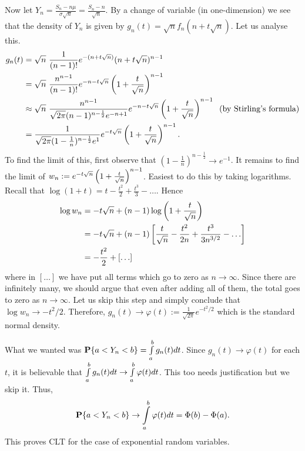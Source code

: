\documentclass[preprint,  11pt]{amsart}
\def\sig{{\sigma}}
\renewcommand\phi{{\varphi}}
\begin{document}
Now let $Y_{n}=\frac{S_{n}-n\mu}{\sig\sqrt{n}}=\frac{S_{n}-n}{\sqrt{n}}$. By a change of variable (in one-dimension) we see that the density of $Y_{n}$ is given by $g_{n}(t)=\sqrt{n}f_{n}(n+t\sqrt{n})$. Let us analyse this.
\begin{align*}
g_{n}(t) &= \sqrt{n}\ \frac{1}{(n-1)!}e^{-(n+t\sqrt{n})}(n+t\sqrt{n})^{n-1}  \\
&= \sqrt{n}\ \frac{n^{n-1}}{(n-1)!}e^{-n-t\sqrt{n}}\l(1+\frac{t}{\sqrt{n}}\r)^{n-1} \\
&\approx \sqrt{n}\ \frac{n^{n-1}}{\sqrt{2\pi}(n-1)^{n-\frac{1}{2}}e^{-n+1}}e^{-n-t\sqrt{n}}\l(1+\frac{t}{\sqrt{n}}\r)^{n-1} \hsp{2mm}(\mb{by Stirling's formula})\\
&= \frac{1}{\sqrt{2\pi}(1-\frac{1}{n})^{n-\frac{1}{2}}e^{1}}e^{-t\sqrt{n}}\l(1+\frac{t}{\sqrt{n}}\r)^{n-1}.
\end{align*}
To find the limit of this, first observe that $(1-\frac{1}{n})^{n-\frac{1}{2}}\to e^{-1}$. It remains to find the limit of $w_{n}:=e^{-t\sqrt{n}}\left(1+\frac{t}{\sqrt{n}}\right)^{n-1}$. Easiest to do this by taking logarithms. Recall that $\log(1+t)=t-\frac{t^{2}}{2}+\frac{t^{3}}{3}-\ldots$. Hence
\begin{align*}
\log w_{n} &= -t\sqrt{n} + (n-1)\log\left(1+\frac{t}{\sqrt{n}}\right) \\
&= -t\sqrt{n} + (n-1)\left[ \frac{t}{\sqrt{n}}-\frac{t^{2}}{2n}+\frac{t^{3}}{3n^{3/2}}-\ldots\right] \\
&= -\frac{t^{2}}{2}+[\ldots]
\end{align*}
where in $[\ldots]$ we have put all terms which go to zero as $n\to \infty$. Since there are infinitely many, we should argue that even after adding all of them, the total goes to zero as $n\to \infty$. Let us skip this step and simply conclude that $\log w_{n}\to -t^{2}/2$. Therefore, $g_{n}(t) \to \phi(t):=\frac{1}{\sqrt{2\pi}}e^{-t^{2}/2}$ which is the standard normal density.

What we wanted was $\mathbf{P}\{a<Y_{n}<b\}=\int\limits_{a}^{b}g_{n}(t) dt$. Since $g_{n}(t)\to \phi(t)$ for each $t$, it is believable that $\intt_{a}^{b}g_{n}(t) dt\to \intt_{a}^{b}\phi(t) dt$. This too needs justification but we skip it. Thus,
$$
\P\{a<Y_{n}<b\} \to \intt_{a}^{b}\phi(t) dt = \Phi(b)-\Phi(a).
$$
This proves CLT for the case of exponential random variables.
\eprf
%
\end{document}

